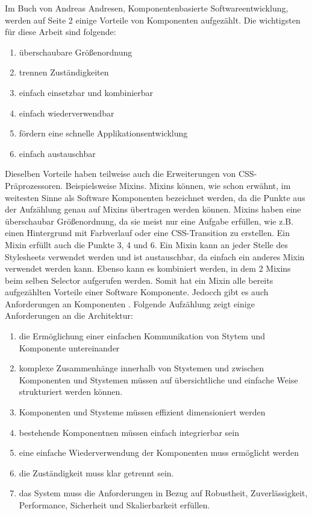 Im Buch von Andreas Andresen, Komponentenbasierte Softwareentwicklung, \autocite[2]{Andresen.2003} werden auf Seite 2 einige Vorteile von Komponenten aufgezählt. Die wichtigsten für diese Arbeit sind folgende:
\begin{enumerate}
  \item überschaubare Größenordnung
  \item trennen Zuständigkeiten
  \item einfach einsetzbar und kombinierbar
  \item einfach wiederverwendbar
  \item fördern eine schnelle Applikationsentwicklung
  \item einfach austauschbar
\end{enumerate} 
Dieselben Vorteile haben teilweise auch die Erweiterungen von CSS-Präprozessoren. Beispielsweise Mixins. Mixins können, wie schon erwähnt, im weitesten Sinne als Software Komponenten bezeichnet werden, da die Punkte aus der Aufzählung genau auf Mixins übertragen werden können. Mixins haben eine überschaubar Größenordnung, da sie meist nur eine Aufgabe erfüllen, wie z.B. einen Hintergrund mit Farbverlauf oder eine CSS-Transition zu erstellen.\newline
Ein Mixin erfüllt auch die Punkte 3, 4 und 6. Ein Mixin kann an jeder Stelle des Stylesheets verwendet werden und ist austauschbar, da einfach ein anderes Mixin verwendet werden kann. Ebenso kann es kombiniert werden, in dem 2 Mixins beim selben Selector aufgerufen werden.\newline
Somit hat ein Mixin alle bereits aufgezählten Vorteile einer Software Komponente. Jedocch gibt es auch Anforderungen an Komponenten \autocite[6]{Andresen.2003}. Folgende Aufzählung zeigt einige Anforderungen an die Architektur:
\begin{enumerate}
\item die Ermöglichung einer einfachen Kommunikation von Stytem und Komponente untereinander
\item komplexe Zusammenhänge innerhalb von Stystemen und zwischen Komponenten und Stystemen müssen auf übersichtliche und einfache Weise strukturiert werden können.
\item Komponenten und Stysteme müssen effizient dimensioniert werden
\item bestehende Komponentnen müssen einfach integrierbar sein
\item eine einfache Wiederverwendung der Komponenten muss ermöglicht werden
\item die Zuständigkeit muss klar getrennt sein.
\item das System muss die Anforderungen in Bezug auf Robustheit, Zuverlässigkeit, Performance, Sicherheit und Skalierbarkeit erfüllen.
\end{enumerate}
